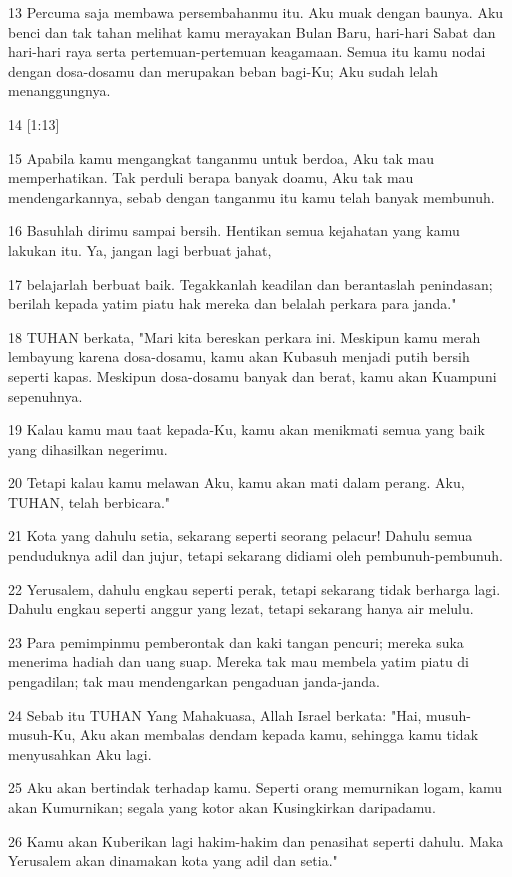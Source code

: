 \par 13 Percuma saja membawa persembahanmu itu. Aku muak dengan baunya. Aku benci dan tak tahan melihat kamu merayakan Bulan Baru, hari-hari Sabat dan hari-hari raya serta pertemuan-pertemuan keagamaan. Semua itu kamu nodai dengan dosa-dosamu dan merupakan beban bagi-Ku; Aku sudah lelah menanggungnya.
\par 14 [1:13]
\par 15 Apabila kamu mengangkat tanganmu untuk berdoa, Aku tak mau memperhatikan. Tak perduli berapa banyak doamu, Aku tak mau mendengarkannya, sebab dengan tanganmu itu kamu telah banyak membunuh.
\par 16 Basuhlah dirimu sampai bersih. Hentikan semua kejahatan yang kamu lakukan itu. Ya, jangan lagi berbuat jahat,
\par 17 belajarlah berbuat baik. Tegakkanlah keadilan dan berantaslah penindasan; berilah kepada yatim piatu hak mereka dan belalah perkara para janda."
\par 18 TUHAN berkata, "Mari kita bereskan perkara ini. Meskipun kamu merah lembayung karena dosa-dosamu, kamu akan Kubasuh menjadi putih bersih seperti kapas. Meskipun dosa-dosamu banyak dan berat, kamu akan Kuampuni sepenuhnya.
\par 19 Kalau kamu mau taat kepada-Ku, kamu akan menikmati semua yang baik yang dihasilkan negerimu.
\par 20 Tetapi kalau kamu melawan Aku, kamu akan mati dalam perang. Aku, TUHAN, telah berbicara."
\par 21 Kota yang dahulu setia, sekarang seperti seorang pelacur! Dahulu semua penduduknya adil dan jujur, tetapi sekarang didiami oleh pembunuh-pembunuh.
\par 22 Yerusalem, dahulu engkau seperti perak, tetapi sekarang tidak berharga lagi. Dahulu engkau seperti anggur yang lezat, tetapi sekarang hanya air melulu.
\par 23 Para pemimpinmu pemberontak dan kaki tangan pencuri; mereka suka menerima hadiah dan uang suap. Mereka tak mau membela yatim piatu di pengadilan; tak mau mendengarkan pengaduan janda-janda.
\par 24 Sebab itu TUHAN Yang Mahakuasa, Allah Israel berkata: "Hai, musuh-musuh-Ku, Aku akan membalas dendam kepada kamu, sehingga kamu tidak menyusahkan Aku lagi.
\par 25 Aku akan bertindak terhadap kamu. Seperti orang memurnikan logam, kamu akan Kumurnikan; segala yang kotor akan Kusingkirkan daripadamu.
\par 26 Kamu akan Kuberikan lagi hakim-hakim dan penasihat seperti dahulu. Maka Yerusalem akan dinamakan kota yang adil dan setia."
